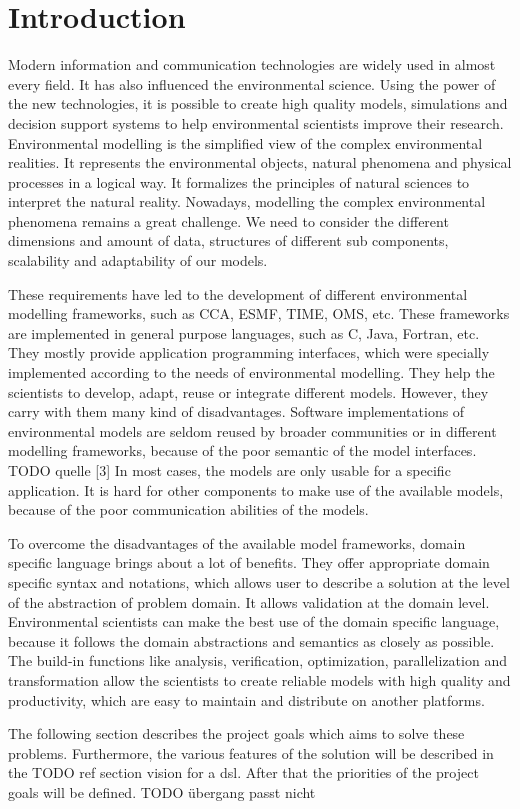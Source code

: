 \chapter{Introduction}
\par
Modern information and communication technologies are widely used in almost every field.  It has also influenced the environmental science. Using the power of the new technologies, it is possible to create high quality models, simulations and decision support systems to help environmental scientists improve their research. Environmental modelling is the simplified view of the complex environmental realities. It represents the environmental objects, natural phenomena and physical processes in a logical way. It formalizes the principles of natural sciences to interpret the natural reality. Nowadays, modelling the complex environmental phenomena remains a great challenge. We need to consider the different dimensions and amount of data, structures of different sub components, scalability and adaptability of our models.
\par
These requirements have led to the development of different environmental modelling frameworks, such as CCA, ESMF, TIME, OMS, etc. These frameworks are implemented in general purpose languages, such as C, Java, Fortran, etc. They mostly provide application programming interfaces, which were specially implemented according to the needs of environmental modelling. They help the scientists to develop, adapt, reuse or integrate different models. However, they carry with them many kind of disadvantages. Software implementations of environmental models are seldom reused by broader communities or in different modelling frameworks, because of the poor semantic of the model interfaces. TODO quelle [3] In most cases, the models are only usable for a specific application. It is hard for other components to make use of the available models, because of the poor communication abilities of the models.
\par
To overcome the disadvantages of the available model frameworks, domain specific language brings about a lot of benefits. They offer appropriate domain specific syntax and notations, which allows user to describe a solution at the level of the abstraction of problem domain. It allows validation at the domain level. Environmental scientists can make the best use of the domain specific language, because it follows the domain abstractions and semantics as closely as possible. The build-in functions like analysis, verification, optimization, parallelization and  transformation allow the scientists to create reliable models with high quality and productivity, which are easy to maintain and distribute on another platforms.
\par
The following section describes the project goals which aims to solve these problems. Furthermore, the various features of the solution will be described in the TODO ref section vision for a dsl. After that the priorities of the project goals will be defined. TODO übergang passt nicht

